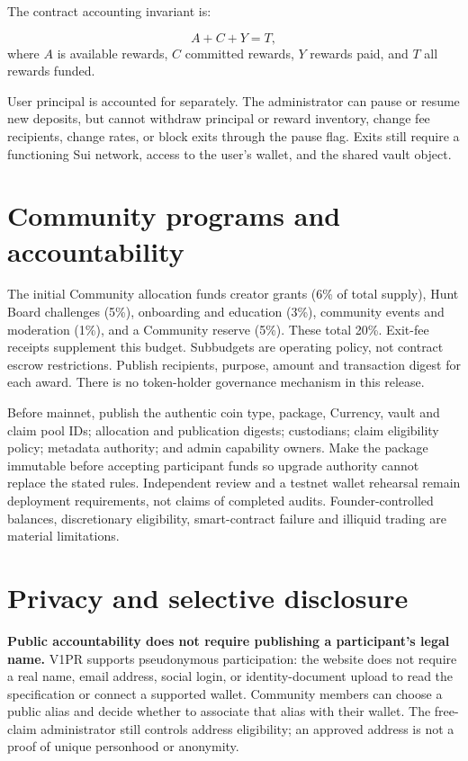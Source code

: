 \documentclass[11pt]{article}
\begin{document}
The contract accounting invariant is:

\begin{equation}
A+C+Y=T,
\end{equation}
\noindent where $A$ is available rewards, $C$ committed rewards, $Y$ rewards paid, and $T$ all rewards funded.

User principal is accounted for separately. The administrator can pause or resume new deposits, but cannot withdraw principal or reward inventory, change fee recipients, change rates, or block exits through the pause flag. Exits still require a functioning Sui network, access to the user's wallet, and the shared vault object.

\section{Community programs and accountability}

The initial Community allocation funds creator grants (6\% of total supply), Hunt Board challenges (5\%), onboarding and education (3\%), community events and moderation (1\%), and a Community reserve (5\%). These total 20\%. Exit-fee receipts supplement this budget. Subbudgets are operating policy, not contract escrow restrictions. Publish recipients, purpose, amount and transaction digest for each award. There is no token-holder governance mechanism in this release.

Before mainnet, publish the authentic coin type, package, Currency, vault and claim pool IDs; allocation and publication digests; custodians; claim eligibility policy; metadata authority; and admin capability owners. Make the package immutable before accepting participant funds so upgrade authority cannot replace the stated rules. Independent review and a testnet wallet rehearsal remain deployment requirements, not claims of completed audits. Founder-controlled balances, discretionary eligibility, smart-contract failure and illiquid trading are material limitations.

\section{Privacy and selective disclosure}

\textbf{Public accountability does not require publishing a participant's legal name.} V1PR supports pseudonymous participation: the website does not require a real name, email address, social login, or identity-document upload to read the specification or connect a supported wallet. Community members can choose a public alias and decide whether to associate that alias with their wallet. The free-claim administrator still controls address eligibility; an approved address is not a proof of unique personhood or anonymity.
\end{document}

